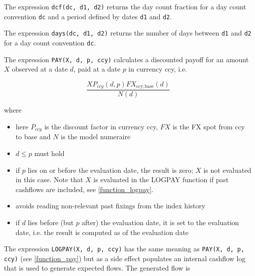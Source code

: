 The expression \verb+dcf(dc, d1, d2)+ returns the day count fraction for a day count convention \verb+dc+ and a period
defined by dates \verb+d1+ and \verb+d2+.


The expression \verb+days(dc, d1, d2)+ returns the number of days between \verb+d1+ and \verb+d2+ for a day count
convention \verb+dc+.

\label{function_pay}

The expression {\tt PAY(X, d, p, ccy)} calculates a discounted payoff for an amount $X$ observed at a date $d$, paid at a
date $p$ in currency ccy, i.e.
  
\begin{equation}
  \frac{X P_{ccy}(d,p) FX_{\text{ccy},\text{base}}(d)}{N(d)}
\end{equation}

where
\begin{itemize}
\item here $P_{ccy}$ is the discount factor in currency ccy, $FX$ is the FX spot from ccy to base and $N$ is the model
  numeraire
\item $d\leq p$ must hold
\item if $p$ lies on or before the evaluation date, the result is zero; $X$ is not evaluated in this case. 
Note that $X$ is evaluated in the LOGPAY function if past cashflows are included, see \ref{function_logpay}.
\item avoids reading non-relevant past fixings from the index history
\item if $d$ lies before (but $p$ after) the evaluation date, it is set to the evaluation date, i.e. the result is
  computed as of the evaluation date
\end{itemize}

\label{function_logpay}

The expression {\tt LOGPAY(X, d, p, ccy)} has the same meaning as {\tt PAY(X, d, p, ccy)} (see \ref{function_pay}) but
as a side effect populates an internal cashflow log that is used to generate expected flows. The generated flow is


